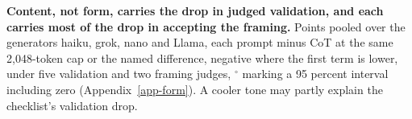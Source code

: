 \begin{table}[t]
\caption{\textbf{Content, not form, carries the drop in judged validation,
and each carries most of the drop in accepting the framing.}
Points pooled over the generators haiku, grok, nano and Llama, each prompt minus CoT at the
same 2,048-token cap or the named difference, negative where the first term
is lower, under five validation and two framing judges, $^{\circ}$ marking a 95 percent interval including zero
(Appendix~\ref{app-form}). A cooler tone may partly explain the checklist's
validation drop.}

\end{table}
